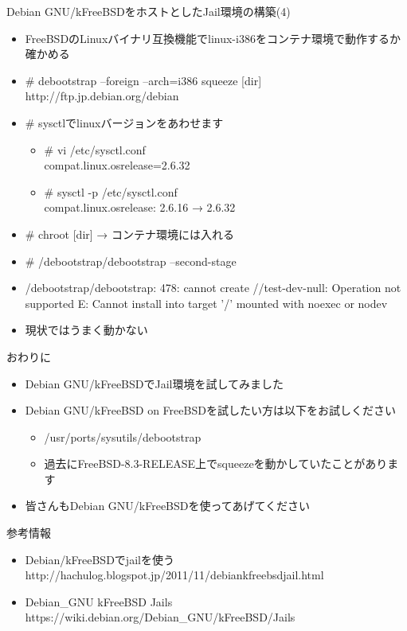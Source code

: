 \begin{frame}[containsverbatim]{Debian GNU/kFreeBSDをホストとしたJail環境の構築(4)}
  \begin{itemize}
    \item FreeBSDのLinuxバイナリ互換機能でlinux-i386をコンテナ環境で動作するか確かめる
    \item \# debootstrap --foreign --arch=i386 squeeze [dir] http://ftp.jp.debian.org/debian
    \item \# sysctlでlinuxバージョンをあわせます
    \begin{itemize}
      \item \# vi /etc/sysctl.conf \\
compat.linux.osrelease=2.6.32
      \item \# sysctl -p /etc/sysctl.conf \\
compat.linux.osrelease: 2.6.16 → 2.6.32
    \end{itemize}
    \item \# chroot [dir] → コンテナ環境には入れる
    \item \# /debootstrap/debootstrap --second-stage
    \item /debootstrap/debootstrap: 478: cannot create //test-dev-null: Operation not supported
E: Cannot install into target '/' mounted with noexec or nodev
    \item 現状ではうまく動かない
  \end{itemize}
\end{frame}


\begin{frame}[containsverbatim]{おわりに}
  \begin{itemize}
    \item Debian GNU/kFreeBSDでJail環境を試してみました
    \item Debian GNU/kFreeBSD on FreeBSDを試したい方は以下をお試しください
    \begin{itemize}
      \item /usr/ports/sysutils/debootstrap
      \item 過去にFreeBSD-8.3-RELEASE上でsqueezeを動かしていたことがあります
    \end{itemize}
    \item 皆さんもDebian GNU/kFreeBSDを使ってあげてください
  \end{itemize}
\end{frame}


\begin{frame}{参考情報}
 \begin{itemize}
  \item Debian/kFreeBSDでjailを使う http://hachulog.blogspot.jp/2011/11/debiankfreebsdjail.html
  \item Debian\_GNU kFreeBSD Jails  https://wiki.debian.org/Debian\_GNU/kFreeBSD/Jails
 \end{itemize}
\end{frame}

